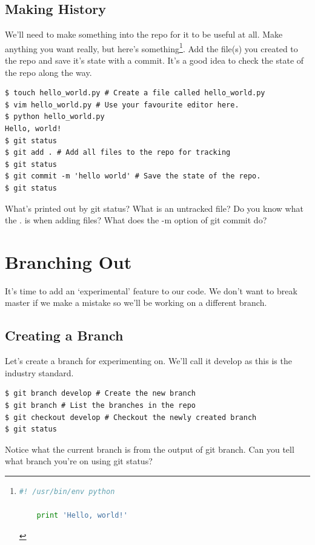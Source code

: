 \documentclass{tufte-handout}
\begin{document}
\subsection{Making History}
We'll need to make something into the repo for it to be useful at all. Make
anything you want really, but here's something\cprotect\footnote{
	\begin{lstlisting}[language=Python]
	#! /usr/bin/env python

	print 'Hello, world!'
	\end{lstlisting}
}. Add the file(s) you created to the repo and save it's state with a commit. 
It's a good idea to check the state of the repo along the way.

\begin{lstlisting}
$ touch hello_world.py # Create a file called hello_world.py
$ vim hello_world.py # Use your favourite editor here.
$ python hello_world.py
Hello, world!
$ git status
$ git add . # Add all files to the repo for tracking
$ git status
$ git commit -m 'hello world' # Save the state of the repo.
$ git status
\end{lstlisting}

\noindent What's printed out by git status? What is an untracked file? Do you know what
the . is when adding files? What does the -m option of git commit do?

\section{Branching Out}
\noindent It's time to add an `experimental' feature to our code. We don't
want to break master if we make a mistake so we'll be working on a different 
branch.

\subsection{Creating a Branch}

\noindent Let's create a branch for experimenting on. We'll call it develop as this is 
the industry standard.

\begin{lstlisting}
$ git branch develop # Create the new branch
$ git branch # List the branches in the repo
$ git checkout develop # Checkout the newly created branch
$ git status
\end{lstlisting}

\noindent Notice what the current branch is from the output of git branch. Can
you tell what branch you're on using git status?
\end{document}
